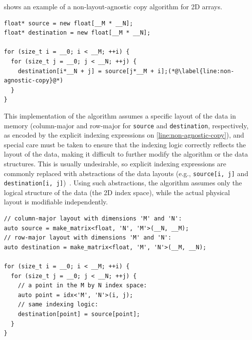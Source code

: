  shows an example of a non-layout-agnostic copy algorithm for 2D arrays.

\begin{lstlisting}[style=C++, caption={A non-layout-agnostic copy algorithm in \cpp}, label={lst:non-agnostic-copy}]
float* source = new float[__M * __N];
float* destination = new float[__M * __N];

for (size_t i = __0; i < __M; ++i) {
  for (size_t j = __0; j < __N; ++j) {
    destination[i*__N + j] = source[j*__M + i];(*@\label{line:non-agnostic-copy}@*)
  }
}
\end{lstlisting}

This implementation of the algorithm assumes a specific layout of the data in memory (column-major and row-major for \lstinline{source} and \lstinline{destination}, respectively, as encoded by the explicit indexing expressions on \cref{line:non-agnostic-copy}), and special care must be taken to ensure that the indexing logic correctly reflects the layout of the data, making it difficult to further modify the algorithm or the data structures. This is usually undesirable, so explicit indexing expressions
are commonly replaced with abstractions of the data layouts (e.g., \lstinline{source[i, j]} and \lstinline{destination[i, j]})~\cite{trott2022mdspan,trott2021kokkos,thakkar2023cutlass}. Using such abstractions, the algorithm assumes only the logical structure of the data (the 2D index space), while the actual physical layout is modifiable independently.


\begin{lstlisting}[style=C++, caption={A layout-agnostic copy algorithm}, label={lst:layout-agnostic-copy}]
// column-major layout with dimensions 'M' and 'N':
auto source = make_matrix<float, 'N', 'M'>(__N, __M);
// row-major layout with dimensions 'M' and 'N':
auto destination = make_matrix<float, 'M', 'N'>(__M, __N);

for (size_t i = __0; i < __M; ++i) {
  for (size_t j = __0; j < __N; ++j) {
    // a point in the M by N index space:
    auto point = idx<'M', 'N'>(i, j);
    // same indexing logic:
    destination[point] = source[point];
  }
}
\end{lstlisting}

